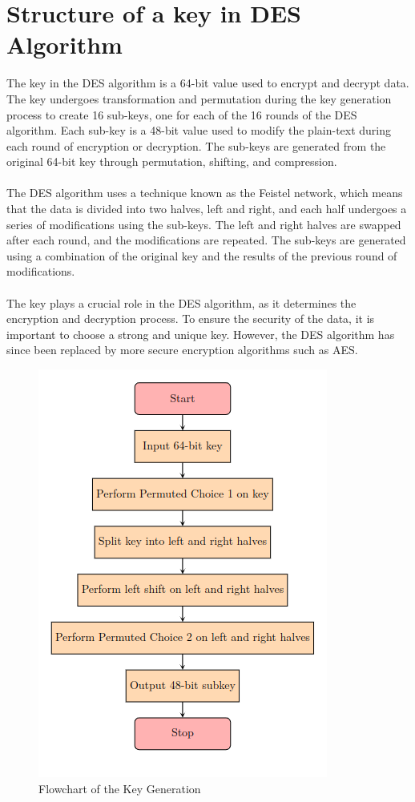 \documentclass[12pt, letterpaper]{article}
\begin{document}
\section{Structure of a key in DES Algorithm}
\label{Hand-cal}
The key in the DES algorithm is a 64-bit value used to encrypt and decrypt data. The key undergoes transformation and permutation during the key generation process to create 16 sub-keys, one for each of the 16 rounds of the DES algorithm. Each sub-key is a 48-bit value used to modify the plain-text during each round of encryption or decryption. The sub-keys are generated from the original 64-bit key through permutation, shifting, and compression.\\
\\
The DES algorithm uses a technique known as the Feistel network, which means that the data is divided into two halves, left and right, and each half undergoes a series of modifications using the sub-keys. The left and right halves are swapped after each round, and the modifications are repeated. The sub-keys are generated using a combination of the original key and the results of the previous round of modifications.\\
\\
The key plays a crucial role in the DES algorithm, as it determines the encryption and decryption process. To ensure the security of the data, it is important to choose a strong and unique key. However, the DES algorithm has since been replaced by more secure encryption algorithms such as AES.

\begin{figure}[hbt!]
    \centering
    \includegraphics[scale=0.6, angle=0]{images/Screenshot from 2023-02-18 21-07-04.png}
    \caption{Flowchart of the Key Generation}
    \label{fig:crazy}
\end{figure}
\end{document}
